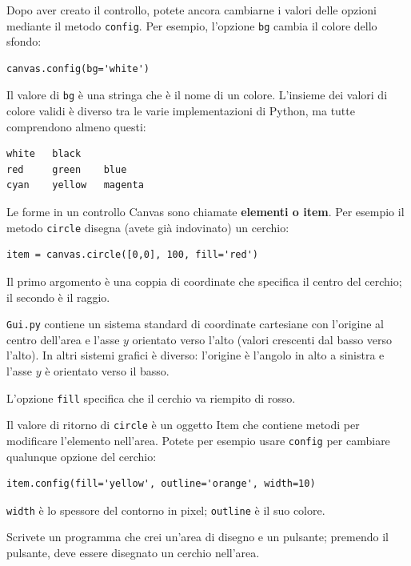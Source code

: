 \documentclass[10pt]{book}
\begin{document}
Dopo aver creato il controllo, potete ancora cambiarne i valori delle opzioni mediante il metodo
{\tt config}.  Per esempio, l'opzione {\tt bg} cambia il colore dello sfondo:

\begin{verbatim}
canvas.config(bg='white')
\end{verbatim}
%
Il valore di {\tt bg} è una stringa che è il nome di un colore. L'insieme dei valori di colore validi è diverso tra le varie implementazioni di Python, ma tutte comprendono almeno questi: 

\begin{verbatim}
white   black
red     green    blue   
cyan    yellow   magenta
\end{verbatim}
%
Le forme in un controllo Canvas sono chiamate {\bf elementi o item}.  Per esempio il metodo {\tt circle} disegna (avete già indovinato) un cerchio:

\begin{verbatim}
item = canvas.circle([0,0], 100, fill='red')
\end{verbatim}
%
Il primo argomento è una coppia di coordinate che specifica il centro del cerchio; il secondo è il raggio.

{\tt Gui.py} contiene un sistema standard di coordinate cartesiane con l'origine al centro dell'area e l'asse $y$ orientato verso l'alto (valori crescenti dal basso verso l'alto). In altri sistemi grafici è diverso: l'origine è l'angolo in alto a sinistra e l'asse $y$ è orientato verso il basso. 

L'opzione {\tt fill} specifica che il cerchio va riempito di rosso.

Il valore di ritorno di {\tt circle} è un oggetto Item che contiene metodi per modificare l'elemento nell'area. Potete per esempio usare {\tt config} per cambiare qualunque opzione del cerchio:

\begin{verbatim}
item.config(fill='yellow', outline='orange', width=10)
\end{verbatim}
%
{\tt width} è lo spessore del contorno in pixel;
{\tt outline} è il suo colore.

\vspace{0.2in}
\begin{exercise}
\label{circle}

Scrivete un programma che crei un'area di disegno e un pulsante; premendo il pulsante, deve essere disegnato un cerchio nell'area.

\end{exercise}
\end{document}
